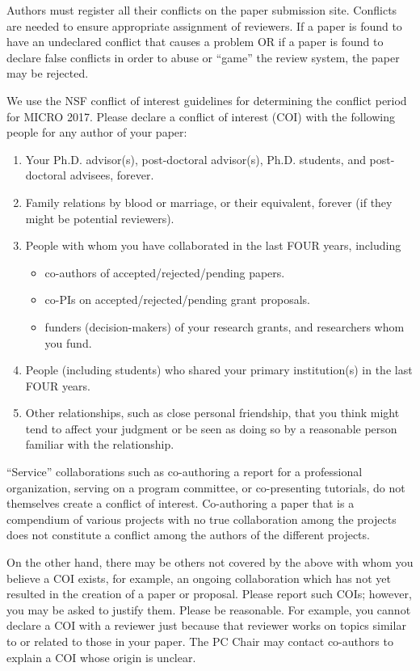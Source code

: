 \documentclass{sig-alternate}
\begin{document}
Authors must register all their conflicts on the paper submission site.
Conflicts are needed to ensure appropriate assignment of reviewers.  
If a paper is found to have an undeclared conflict that causes
a problem OR if a paper is found to declare false conflicts in order to
abuse or ``game'' the review system, the paper may be rejected.

We use the NSF conflict of interest guidelines for determining the
conflict period for MICRO 2017.  Please declare a conflict of interest
(COI) with the following people for any author of your paper:

\begin{enumerate}
\item Your Ph.D. advisor(s), post-doctoral advisor(s), Ph.D. students, 
      and post-doctoral advisees, forever. 
\item Family relations by blood or marriage, or their equivalent, 
      forever (if they might be potential reviewers).
\item People with whom you have collaborated in the last FOUR years, including 
\begin{itemize}
\item co-authors of accepted/rejected/pending papers.
\item co-PIs on accepted/rejected/pending grant proposals.
\item funders (decision-makers) of your research grants, and researchers 
      whom you fund. 
\end{itemize}
\item People (including students) who shared your primary institution(s) in the 
last FOUR years. 
\item Other relationships, such as close personal friendship, that you think might tend
to affect your judgment or be seen as doing so by a reasonable person familiar
with the relationship.
\end{enumerate}

``Service'' collaborations such as co-authoring a report for a professional 
organization, serving on a program committee, or co-presenting 
tutorials, do not themselves create a conflict of interest. 
Co-authoring a paper that is a compendium of various projects with 
no true collaboration among the projects does not constitute a 
conflict among the authors of the different projects.

On the other hand, there may be others not covered by the above with
whom you believe a COI exists, for example, an ongoing collaboration
which has not yet resulted in the creation of a paper or proposal.
Please report such COIs; however, you may be asked to justify them.
Please be reasonable. For example, you cannot declare a COI with a
reviewer just because that reviewer works on topics similar to or
related to those in your paper.  The PC Chair may contact co-authors
to explain a COI whose origin is unclear.
\end{document}

